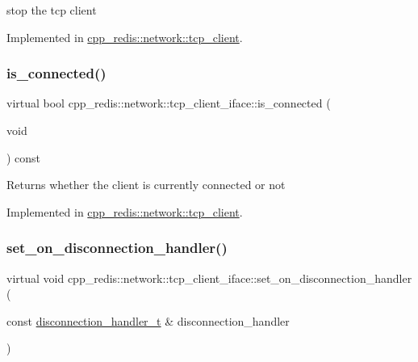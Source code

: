 stop the tcp client 

Implemented in \hyperlink{classcpp__redis_1_1network_1_1tcp__client_a040eecbe084e6cf1770f5c56aaeef848}{cpp\+\_\+redis\+::network\+::tcp\+\_\+client}.

\mbox{\label{classcpp__redis_1_1network_1_1tcp__client__iface_a41ad0b43e3ab172828a3d2ce55d23893}} 
\subsubsection{\texorpdfstring{is\+\_\+connected()}{is\_connected()}}
{\footnotesize\ttfamily virtual bool cpp\+\_\+redis\+::network\+::tcp\+\_\+client\+\_\+iface\+::is\+\_\+connected (\begin{DoxyParamCaption}\item[{void}]{ }\end{DoxyParamCaption}) const\hspace{0.3cm}{\ttfamily [pure virtual]}}

\begin{DoxyReturn}{Returns}
whether the client is currently connected or not 
\end{DoxyReturn}


Implemented in \hyperlink{classcpp__redis_1_1network_1_1tcp__client_a0a636ca6bd59425bf22416a1c7694f65}{cpp\+\_\+redis\+::network\+::tcp\+\_\+client}.

\mbox{\label{classcpp__redis_1_1network_1_1tcp__client__iface_acecf3b75c3849071d82478bc7a8c97a8}} 
\subsubsection{\texorpdfstring{set\+\_\+on\+\_\+disconnection\+\_\+handler()}{set\_on\_disconnection\_handler()}}
{\footnotesize\ttfamily virtual void cpp\+\_\+redis\+::network\+::tcp\+\_\+client\+\_\+iface\+::set\+\_\+on\+\_\+disconnection\+\_\+handler (\begin{DoxyParamCaption}\item[{const \hyperlink{classcpp__redis_1_1network_1_1tcp__client__iface_a9a7d5942205db8be03da581a848b8ec0}{disconnection\+\_\+handler\+\_\+t} \&}]{disconnection\+\_\+handler }\end{DoxyParamCaption})\hspace{0.3cm}{\ttfamily [pure virtual]}}

